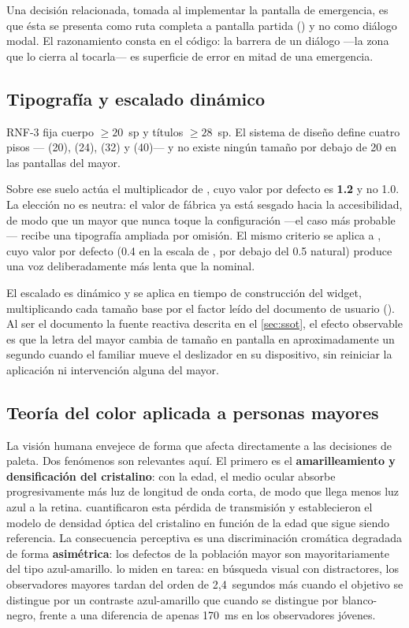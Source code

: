 Una decisión relacionada, tomada al implementar la pantalla de emergencia, es que ésta se presenta como
ruta completa a pantalla partida () y no como diálogo modal. El razonamiento consta
en el código: la barrera de un diálogo ---la zona que lo cierra al tocarla--- es superficie de error en
mitad de una emergencia.

\subsection{Tipografía y escalado dinámico}

RNF-3 fija cuerpo $\geq 20$~sp y títulos $\geq 28$~sp. El sistema de diseño define cuatro pisos
--- (20),  (24),  (32) y  (40)--- y no
existe ningún tamaño por debajo de 20 en las pantallas del mayor.

Sobre ese suelo actúa el multiplicador  de , cuyo valor por
defecto es \textbf{1.2} y no 1.0. La elección no es neutra: el valor de fábrica ya está sesgado hacia la
accesibilidad, de modo que un mayor que nunca toque la configuración ---el caso más probable--- recibe una
tipografía ampliada por omisión. El mismo criterio se aplica a , cuyo valor por defecto
(0.4 en la escala de , por debajo del 0.5 natural) produce una voz deliberadamente más
lenta que la nominal.

El escalado es dinámico y se aplica en tiempo de construcción del widget, multiplicando cada tamaño base
por el factor leído del documento de usuario (). Al ser el documento la
fuente reactiva descrita en el \autoref{sec:ssot}, el efecto observable es que la letra del mayor cambia de
tamaño en pantalla en aproximadamente un segundo cuando el familiar mueve el deslizador en su dispositivo,
sin reiniciar la aplicación ni intervención alguna del mayor.

\subsection{Teoría del color aplicada a personas mayores}
\label{sec:color}

La visión humana envejece de forma que afecta directamente a las decisiones de paleta. Dos fenómenos son
relevantes aquí. El primero es el \textbf{amarilleamiento y densificación del cristalino}: con la edad, el
medio ocular absorbe progresivamente más luz de longitud de onda corta, de modo que llega menos luz azul a
la retina. \textcite{Pokorny1987} cuantificaron esta pérdida de transmisión y establecieron el modelo de
densidad óptica del cristalino en función de la edad que sigue siendo referencia. La consecuencia
perceptiva es una discriminación cromática degradada de forma \textbf{asimétrica}: los defectos de la
población mayor son mayoritariamente del tipo azul-amarillo. \textcite{Tamura2020} lo miden en tarea:
en búsqueda visual con distractores, los observadores mayores tardan del orden de 2{,}4~segundos más
cuando el objetivo se distingue por un contraste azul-amarillo que cuando se distingue por
blanco-negro, frente a una diferencia de apenas 170~ms en los observadores jóvenes.

